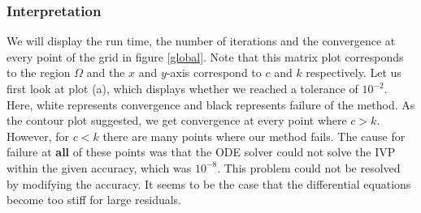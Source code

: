 \documentclass{article}
\begin{document}
\subsubsection{Interpretation}
We will display the run time, the number of iterations and the convergence at 
every point of the grid in figure \ref{global}. Note that this matrix plot corresponds
to the region $\Omega$ and the $x$ and $y$-axis correspond to $c$ and $k$ respectively.
Let us first look at plot (a), which displays whether we reached a tolerance of $10^{-2}$. Here, white represents convergence and black represents failure of the method. As the contour plot suggested,
we get convergence at every point  where $c>k$. However, for $c<k$ there are many points where our
method fails. The cause for failure at \textbf{all} of these points was that the ODE solver could
not solve the IVP within the given accuracy, which was $10^{-8}$. This problem could not be resolved by modifying the accuracy. It seems to be the case that the differential equations become too stiff for large residuals. \par
\end{document}
